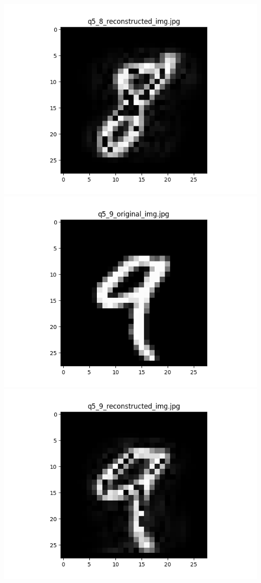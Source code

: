 \documentclass{article}
\begin{document}
    \includegraphics[scale=.6]{../results/q5/reconstrcuted/q5_8_reconstructed.png}
    \\
    \includegraphics[scale=.6]{../results/q5/original/q5_9_original.png}
    \includegraphics[scale=.6]{../results/q5/reconstrcuted/q5_9_reconstructed.png}
\end{document}
